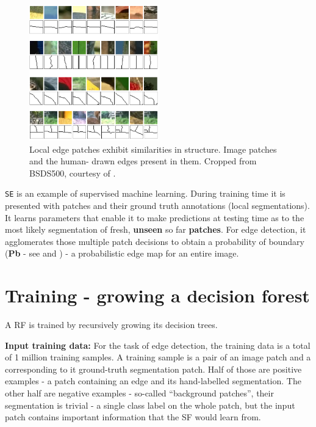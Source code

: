 \begin{figure}[t]
\centering
 \includegraphics[width=0.5\textwidth]{images/srf/structure-in-edge-patches.png}
\caption[Local patches exhibit similarities in edge structure]{Local edge patches exhibit similarities in structure. Image patches and the human-%
drawn edges present in them. Cropped from BSDS500, courtesy of \cite{DollarICCV13PresentationSlides}.}
\label{fig:srf-structure-in-edge-patches}
\end{figure}

{\tt SE} is an example of supervised machine learning. During training time it is presented with patches and their ground truth annotations (local segmentations). It learns parameters that enable it to make predictions at testing time as to the most likely segmentation of fresh, {\bf unseen} so far {\bf patches}. For edge detection, it agglomerates those multiple patch decisions to obtain a probability of boundary ({\bf Pb} - see  and ) - a probabilistic edge map for an entire image.

\section{Training - growing a decision forest}
A RF is trained by recursively growing its decision trees. 

\textbf{Input training data:} For the task of edge detection, the training data is a total of 1 million training samples. A training sample is a pair of an image patch and a corresponding to it ground-truth segmentation patch. Half of those are positive examples - a patch containing an edge and its hand-labelled segmentation. The other half are negative examples - so-called ``background patches'', their segmentation is trivial - a single class label on the whole patch, but the input patch contains important information that the SF would learn from. 


